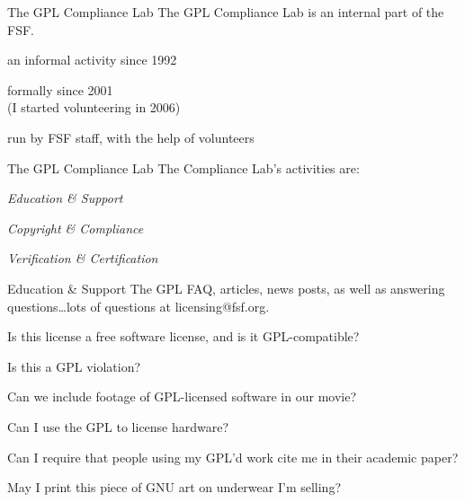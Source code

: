 \documentclass[
  size=12pt,
  style=simple,
  paper=screen
]{powerdot}
\begin{document}
\begin{wideslide}{The GPL Compliance Lab}
  The GPL Compliance Lab is an internal part of the FSF.

  \begin{itemize}
    \setlength{\itemsep}{1em}

    \nitem an informal activity since 1992

    \nitem formally since 2001\\\pp(I started volunteering in 2006)

    \pp

    \nitem run by FSF staff, with the help of volunteers
  \end{itemize}
\end{wideslide}

\begin{wideslide}{The GPL Compliance Lab}
  The Compliance Lab's activities are:
  \begin{itemize}
    \setlength{\itemsep}{1em}

    \nitem \emph{Education \& Support}

    \nitem \emph{Copyright \& Compliance}

    \nitem \emph{Verification \& Certification}
  \end{itemize}
\end{wideslide}

\begin{wideslide}{Education \& Support}
  The GPL FAQ, articles, news posts, as well as answering
  questions\ldots lots of questions at licensing@fsf.org.

  \pp

  \begin{itemize}
    \setlength{\itemsep}{1em}

    \nitem Is this license a free software license, and is it
    GPL-compatible?

    \pp

    \nitem Is this a GPL violation?

    \pp

    \nitem Can we include footage of GPL-licensed software in our
    movie?

    \pp

    \nitem Can I use the GPL to license hardware?

    \pp

    \nitem Can I require that people using my GPL'd work cite me in
    their academic paper?

    \pp

    \nitem May I print this piece of GNU art on underwear I'm selling?
  \end{itemize}
\end{wideslide}
\end{document}
